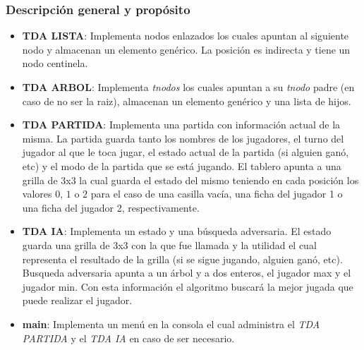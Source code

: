\documentclass[12pt,a4paper]{article}
\begin{document}
\subsubsection{Descripci\'on general y prop\'osito}
\begin{itemize}
    \item {\bf TDA LISTA}: Implementa nodos enlazados los cuales apuntan al siguiente nodo y almacenan un elemento gen\'erico. La posici\'on es indirecta y tiene un nodo centinela.
	\item {\bf TDA ARBOL}: Implementa \emph{tnodos} los cuales apuntan a su \emph{tnodo} padre (en caso de no ser la raiz), almacenan un elemento gen\'erico y una lista de hijos.
    \item {\bf TDA PARTIDA}: Implementa una partida con informaci\'on actual de la misma. La partida guarda tanto los nombres de los jugadores, el turno del jugador al que le toca jugar, el estado actual de la partida (si alguien gan\'o, etc) y el modo de la partida que se est\'a jugando. El tablero apunta a una grilla de 3x3 la cual guarda el estado del mismo teniendo en cada posici\'on los valores $0$, $1$ o $2$ para el caso de una casilla vac\'ia, una ficha del jugador 1 o una ficha del jugador 2, respectivamente.
    \item {\bf TDA IA}: Implementa un estado y una b\'usqueda adversaria. El estado guarda una grilla de 3x3 con la que fue llamada y la utilidad el cual representa el resultado de la grilla (si se sigue jugando, alguien gan\'o, etc). Busqueda adversaria apunta a un \'arbol y a dos enteros, el jugador max y el jugador min. Con esta informaci\'on el algoritmo buscar\'a la mejor jugada que puede realizar el jugador.
    \item {\bf main}: Implementa un men\'u en la consola el cual administra el {\itshape TDA PARTIDA} y el {\itshape TDA IA} en caso de ser necesario.
\end{itemize}
\end{document}

